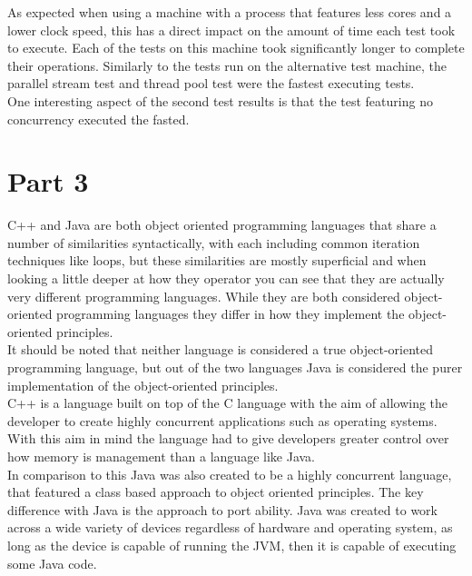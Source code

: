 \documentclass[10pt]{article}  %
\theoremstyle{definition}
\theoremstyle{remark}
\begin{document}
As expected when using a machine with a process that features less cores and a lower clock speed, this has a direct impact on the amount of time each test took to execute. Each of the tests on this machine took significantly longer to complete their operations. Similarly to the tests run on the alternative test machine, the parallel stream test and thread pool test were the fastest executing tests.\\

One interesting aspect of the second test results is that the test featuring no concurrency executed the fasted.





\newpage
\section{Part 3}\label{s:intro}

C++ and Java are both object oriented programming languages that share a number of similarities syntactically, with each including common iteration techniques like loops, but these similarities are mostly superficial and when looking a little deeper at how they operator you can see that they are actually very different programming languages. While they are both considered object-oriented programming languages they differ in how they implement the object-oriented principles.\\

It should be noted that neither language is considered a true object-oriented programming language, but out of the two languages Java is considered the purer implementation of the object-oriented principles.\\

C++ is a language built on top of the C language with the aim of allowing the developer to create highly concurrent applications such as operating systems. With this aim in mind the language had to give developers greater control over how memory is management than a language like Java.\\ 

In comparison to this Java was also created to be a highly concurrent language, that featured a class based approach to object oriented principles. The key difference with Java is the approach to port ability. Java was created to work across a wide variety of devices regardless of hardware and operating system, as long as the device is capable of running the JVM, then it is capable of executing some Java code. 
\end{document}

